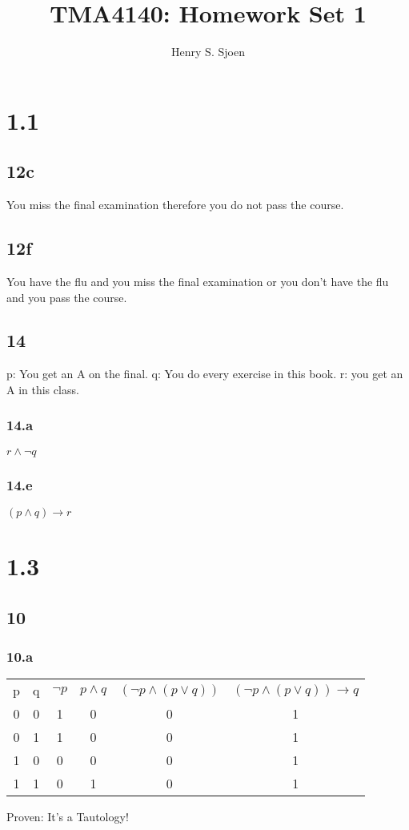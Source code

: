 \documentclass[12pt]{article}
\author{Henry S. Sjoen}
\title{TMA4140: Homework Set 1}
\begin{document}
    \maketitle
    \tableofcontents
\title{}
    \section{1.1}
    \subsection{12c}
You miss the final examination therefore you do not pass the course.
\subsection{12f}
You have the flu and you miss the final examination or you don't have the flu and you pass the course.
\subsection{14}
p: You get an A on the final. \newline
q: You do every exercise in this book. \newline
r: you get an A in this class.

\subsubsection{14.a}

\begin{math}
  r \wedge \neg q
\end{math}

\subsubsection{14.e}
\begin{math}
  (p \wedge q) \rightarrow r
\end{math}
\section{1.3}
\subsection{10}
\subsubsection{10.a}
\begin{table}[tbh]
  \begin{tabular}{cccccc}
    p  & q  & $\neg p$ & $p \wedge q$  & $(\neg p \wedge (p \vee q))$ &$(\neg p \wedge (p \vee q)) \rightarrow q$  \\
    0  & 0  & 1        & 0 & 0 &1\\
    0  & 1  & 1        & 0 & 0 &1\\
    1  & 0  & 0        & 0 & 0 &1\\
    1  & 1  & 0        & 1 & 0 &1\\ 
  \end{tabular}
\end{table}
Proven: It's a Tautology!
\end{document}
